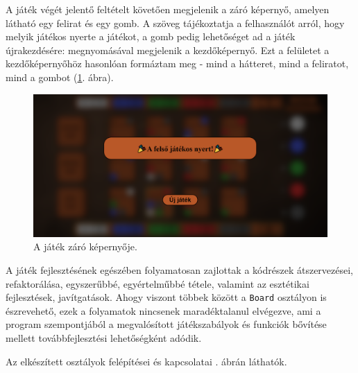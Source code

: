 
A játék végét jelentő feltételt követően megjelenik a záró képernyő, amelyen látható egy felirat és egy gomb. A szöveg tájékoztatja a felhasználót arról, hogy melyik játékos nyerte a játékot, a gomb pedig lehetőséget ad a játék újrakezdésére: megnyomásával megjelenik a kezdőképernyő. Ezt a felületet a kezdőképernyőhöz hasonlóan formáztam meg - mind a hátteret, mind a feliratot, mind a gombot (\ref{fig:end_screen}. ábra).

\begin{figure}[h!]
\centering
\includegraphics[width=\textwidth]{images/end_screen.png}
\caption{A játék záró képernyője.}
\label{fig:end_screen}
\end{figure}


A játék fejlesztésének egészében folyamatosan zajlottak a kódrészek átszervezései, refaktorálása, egyszerűbbé, egyértelműbbé tétele, valamint az esztétikai fejlesztések, javítgatások. Ahogy viszont többek között a \texttt{Board} osztályon is észrevehető, ezek a folyamatok nincsenek maradéktalanul elvégezve, ami a program szempontjából a megvalósított játékszabályok és funkciók bővítése mellett továbbfejlesztési lehetőségként adódik.


Az elkészített osztályok felépítései és kapcsolatai . ábrán láthatók.

